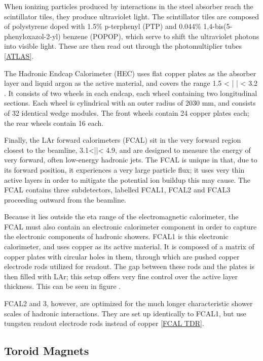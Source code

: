 When ionizing particles produced by interactions in the steel absorber reach the scintillator tiles, they produce ultraviolet light. The scintillator tiles are composed of polystyrene doped with 1.5\%  p-terphenyl (PTP) and 0.044\% 1,4-bis(5-phenyloxazol-2-yl) benzene (POPOP), which serve to shift the ultraviolet photons into visible light. These are then read out through the photomultiplier tubes \ref{ATLAS}.

The Hadronic Endcap Calorimeter (HEC) uses flat copper plates as the absorber layer and liquid argon as the active material, and covers the range  1.5 < | \eta | < 3.2 . It consists of two wheels in each endcap, each wheel containing two longitudinal sections. Each wheel is cylindrical with an outer radius of 2030 mm, and consists of 32 identical wedge modules. The front wheels contain 24 copper plates each; the rear wheels contain 16 each.

Finally, the LAr forward calorimeters (FCAL) sit in the very forward region closest to the beamline, 3.1<|\eta |< 4.9, and are designed to measure the energy of very forward, often low-energy hadronic jets.  The FCAL is unique in that, due to its forward position, it experiences a very large particle flux; it uses very thin active layers in order to mitigate the potential ion buildup this may cause.  The FCAL contains three subdetectors, labelled FCAL1, FCAL2 and FCAL3 proceeding outward from the beamline.

Because it lies outside the eta range of the electromagnetic calorimeter, the FCAL must also contain an electronic calorimeter component in order to capture the electronic components of hadronic showers. FCAL1 is this electronic calorimeter, and uses copper as its active material. It is composed of a matrix of copper plates with circular holes in them, through which are pushed copper electrode rods utilized for readout. The gap between these rods and the plates is then filled with LAr; this setup offers very fine control over the active layer thickness. This can be seen in figure .

FCAL2 and 3, however, are optimized for the much longer characteristic shower scales of hadronic interactions. They are set up identically to FCAL1, but use tungsten readout electrode rods instead of copper \ref{FCAL TDR}.

\subsection{Toroid Magnets} \label{sec:toroids}

